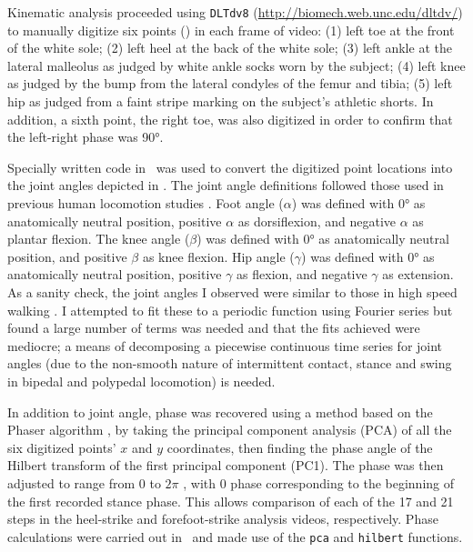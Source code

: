 Kinematic analysis proceeded using \citet{hedrick2008software} \lstinline{DLTdv8} (\url{http://biomech.web.unc.edu/dltdv/}) to manually digitize six points () in each frame of video: (1) left toe at the front of the white sole; (2) left heel at the back of the white sole; (3) left ankle at the lateral malleolus as judged by white ankle socks worn by the subject; (4) left knee as judged by the bump from the lateral condyles of the femur and tibia; (5) left hip as judged from a faint stripe marking on the subject's athletic shorts. In addition, a sixth point, the right toe, was also digitized in order to confirm that the left-right phase was \ang{90}. 

Specially written code in \Matlab\ was used to convert the digitized point locations into the joint angles depicted in . The joint angle definitions followed those used in previous human locomotion studies \citep{qiao2016leg, giandolini2013impact, larson2014comparison, hamner2010muscle, liu2008muscle, dickinson1985measurement, mcmahon1984muscles}. Foot angle ($\alpha$) was defined with \ang{0} as anatomically neutral position, positive $\alpha$ as dorsiflexion, and negative $\alpha$ as plantar flexion. The knee angle ($\beta$) was defined with \ang{0} as anatomically neutral position, and positive $\beta$ as knee flexion. Hip angle ($\gamma$) was defined with \ang{0} as anatomically neutral position, positive $\gamma$ as flexion, and negative $\gamma$ as extension. As a sanity check, the joint angles I observed were similar to those in high speed walking \citep{liu2008muscle}. I attempted to fit these to a periodic function using Fourier series but found a large number of terms was needed and that the fits achieved were mediocre; a means of decomposing a piecewise continuous time series for joint angles (due to the non-smooth nature of intermittent contact, stance and swing in bipedal and polypedal locomotion) is needed. 

In addition to joint angle, phase was recovered using a method based on the Phaser algorithm \citep{revzen2008estimating}, by taking the principal component analysis (PCA) of all the six digitized points' $x$ and $y$ coordinates, then finding the phase angle of the Hilbert transform of the first principal component (PC1). The phase was then adjusted to range from 0 to $2\pi$ \citep{revzen2009towards}, with 0 phase corresponding to the beginning of the first recorded stance phase. This allows comparison of each of the 17 and 21 steps in the heel-strike and forefoot-strike analysis videos, respectively. Phase calculations were carried out in \Matlab\ and made use of the \lstinline{pca} and \lstinline{hilbert} functions. 

